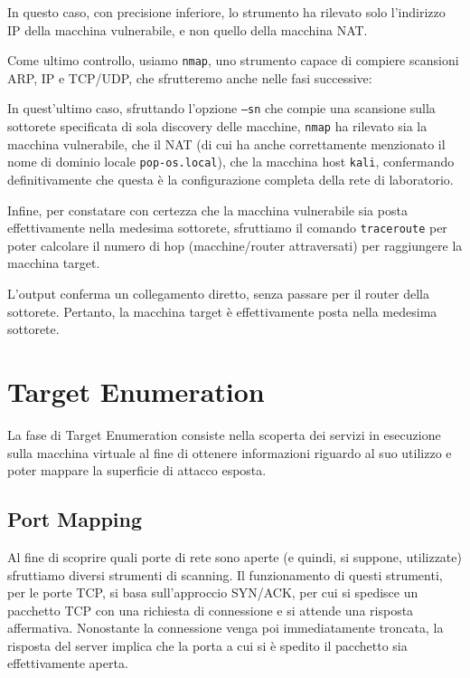 \documentclass[12pt, a4paper]{article}
\begin{document}
	
	In questo caso, con precisione inferiore, lo strumento ha rilevato solo l'indirizzo IP della macchina vulnerabile, e non quello della macchina NAT.
	
	Come ultimo controllo, usiamo \texttt{nmap}\cite{nmap}, uno strumento capace di compiere scansioni ARP, IP e TCP/UDP, che sfrutteremo anche nelle fasi successive:
	
	
	\newpage
	In quest'ultimo caso, sfruttando l'opzione \texttt{--sn} che compie una scansione sulla sottorete specificata di sola discovery delle macchine, \texttt{nmap} ha rilevato sia la macchina vulnerabile, che il NAT (di cui ha anche correttamente menzionato il nome di dominio locale \texttt{pop-os.local}), che la macchina host \texttt{kali}, confermando definitivamente che questa è la configurazione completa della rete di laboratorio.
	
	Infine, per constatare con certezza che la macchina vulnerabile sia posta effettivamente nella medesima sottorete, sfruttiamo il comando \texttt{traceroute}\cite{traceroute} per poter calcolare il numero di hop (macchine/router attraversati) per raggiungere la macchina target.
	
	
	L'output conferma un collegamento diretto, senza passare per il router della sottorete. Pertanto, la macchina target è effettivamente posta nella medesima sottorete.
	
	\newpage
	\section{Target Enumeration}
	La fase di Target Enumeration consiste nella scoperta dei servizi in esecuzione sulla macchina virtuale al fine di ottenere informazioni riguardo al suo utilizzo e poter mappare la superficie di attacco esposta.
	
	\subsection{Port Mapping}
	Al fine di scoprire quali porte di rete sono aperte (e quindi, si suppone, utilizzate) sfruttiamo diversi strumenti di scanning. Il funzionamento di questi strumenti, per le porte TCP, si basa sull'approccio SYN/ACK, per cui si spedisce un pacchetto TCP con una richiesta di connessione e si attende una risposta affermativa. Nonostante la connessione venga poi immediatamente troncata, la risposta del server implica che la porta a cui si è spedito il pacchetto sia effettivamente aperta.
	
\end{document}
